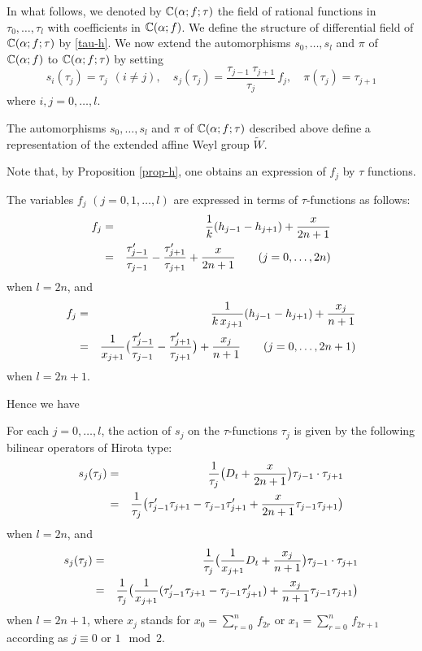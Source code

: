 \medskip
In what follows, we denoted by ${\Bbb C}(\alpha;f;\tau)$ the field of rational 
functions in $\tau_0,\ldots,\tau_l$ with coefficients in ${\Bbb C}(\alpha;f)$. 
We define the structure of differential field of ${\Bbb C}(\alpha;f;\tau)$
by \eqref{tau-h}. 
We now extend the automorphisms $s_0,\ldots,s_l$ and $\pi$ of ${\Bbb C}(\alpha;f)$
to ${\Bbb C}(\alpha;f;\tau)$ by setting 
\begin{equation}
s_i(\tau_j)=\tau_j \ \ (i\ne j),\quad
s_j(\tau_j)=\frac{\tau_{j-1}\ \tau_{j+1}}{\tau_j}\, f_j,
\quad
\pi(\tau_j)=\tau_{j+1} 
\end{equation}
where $i,j=0,\ldots,l$. 
\begin{thm}[\cite{NY3}] The automorphisms $s_0,\ldots, s_l$ and $\pi$ 
of ${\Bbb C}(\alpha;f;\tau)$ described above define a representation of 
the extended affine Weyl group $\widetilde{W}$. 
\end{thm}

Note that, by Proposition \ref{prop-h}, one obtains an expression 
of $f_j$ by $\tau$ functions.
\begin{prop} 
The variables $f_j$  $(j=0,1,\ldots,l)$ are expressed in terms of $\tau$-functions 
as follows:
\begin{eqnarray}
f_j&=&\frac{1}{k}(h_{j-1}-h_{j+1})+\frac{x}{2n+1}\\
&=& \frac{\tau_{j-1}'}{\tau_{j-1}} 
-\frac{\tau_{j+1}'}{\tau_{j+1}}+\frac{x}{2n+1}
\qquad (j=0,\ldots,2n)\notag
\end{eqnarray}
when $l=2n$, and
\begin{eqnarray}
f_j&=&\frac{1}{k \, x_{j+1}}(h_{j-1}-h_{j+1})+
\frac{x_j}{n+1}\\
&=& \frac{1}{x_{j+1}}\big(\frac{\tau_{j-1}'}{\tau_{j-1}} 
-\frac{\tau_{j+1}'}{\tau_{j+1}}\big)+\frac{x_j}{n+1}
\qquad (j=0,\ldots,2n+1)\notag
\end{eqnarray}
when $l=2n+1$. 
\end{prop}
\noindent

Hence we have
 
\begin{prop}
For each $j=0,\ldots,l$, 
the action of $s_j$ on the $\tau$-functions $\tau_j$ is given by the following bilinear operators 
of Hirota type:  
\begin{eqnarray}
s_j(\tau_j)&=&\frac{1}{\tau_j}\big(D_{t}+
\frac{x}{2n+1}\big)\tau_{j-1}\cdot\tau_{j+1}\\
&=&\frac{1}{\tau_j}\big(\tau_{j-1}'\tau_{j+1}-\tau_{j-1}\tau_{j+1}'+
\frac{x}{2n+1}\tau_{j-1}\tau_{j+1}\big)\notag
\end{eqnarray}
when $l=2n$, and  
\begin{eqnarray}
s_j(\tau_j)&=&\frac{1}{\tau_j}\big(
\frac{1}{x_{j+1}}D_t+
\frac{x_j}{n+1}\big) \tau_{j-1}\cdot\tau_{j+1}
\\
&=&\frac{1}{\tau_j}\big(
\frac{1}{x_{j+1}}(\tau_{j-1}'\tau_{j+1}-\tau_{j-1}\tau_{j+1}')+
\frac{x_j}{n+1}\tau_{j-1}\tau_{j+1}
\big)\notag
\end{eqnarray} 
when $l=2n+1$, where $x_j$ stands for $x_0=\sum_{r=0}^n \, f_{2r}$ or 
$x_1=\sum_{r=0}^n \, f_{2r+1}$ according as $j\equiv 0$ or $1 \mod 2$. 
\end{prop}

